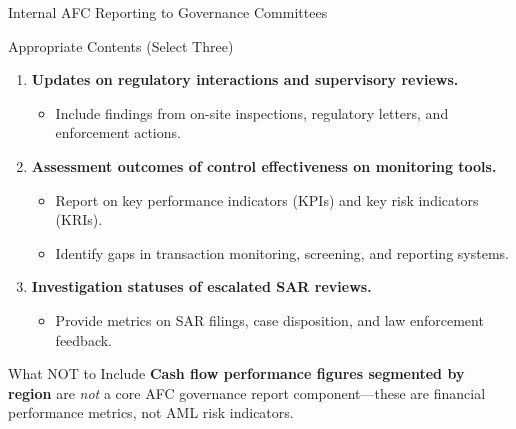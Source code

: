 \documentclass{beamer}
\begin{document}
	\begin{frame}{Internal AFC Reporting to Governance Committees}
		\begin{block}{Appropriate Contents (Select Three)}
			\begin{enumerate}
				\item \textbf{Updates on regulatory interactions and supervisory reviews.}
				\begin{itemize}
					\item Include findings from on-site inspections, regulatory letters, and enforcement actions.
				\end{itemize}
				\item \textbf{Assessment outcomes of control effectiveness on monitoring tools.}
				\begin{itemize}
					\item Report on key performance indicators (KPIs) and key risk indicators (KRIs).
					\item Identify gaps in transaction monitoring, screening, and reporting systems.
				\end{itemize}
				\item \textbf{Investigation statuses of escalated SAR reviews.}
				\begin{itemize}
					\item Provide metrics on SAR filings, case disposition, and law enforcement feedback.
				\end{itemize}
			\end{enumerate}
		\end{block}
		\begin{alertblock}{What NOT to Include}
			\textbf{Cash flow performance figures segmented by region} are \textit{not} a core AFC governance report component—these are financial performance metrics, not AML risk indicators.
		\end{alertblock}
	\end{frame}
	
\end{document}
